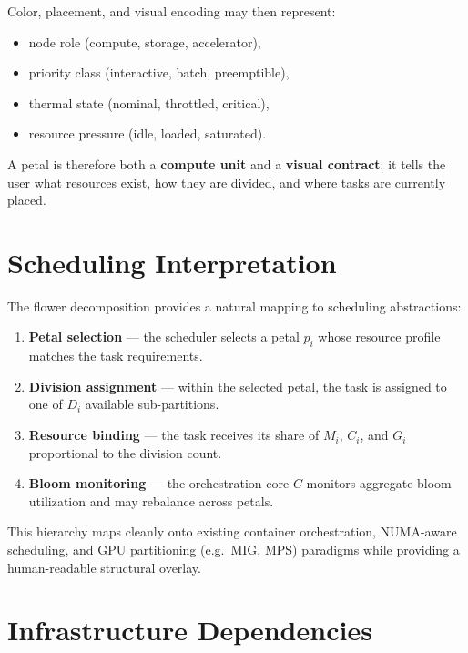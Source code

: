 \documentclass[11pt, a4paper, oneside]{article}
\theoremstyle{definition}
\begin{document}
Color, placement, and visual encoding may then represent:
\begin{itemize}
  \item node role (compute, storage, accelerator),
  \item priority class (interactive, batch, preemptible),
  \item thermal state (nominal, throttled, critical),
  \item resource pressure (idle, loaded, saturated).
\end{itemize}

A petal is therefore both a \textbf{compute unit} and a \textbf{visual
contract}: it tells the user what resources exist, how they are divided, and
where tasks are currently placed.

\section{Scheduling Interpretation}

The flower decomposition provides a natural mapping to scheduling abstractions:

\begin{enumerate}
  \item \textbf{Petal selection} — the scheduler selects a petal $p_i$ whose
        resource profile matches the task requirements.
  \item \textbf{Division assignment} — within the selected petal, the task
        is assigned to one of $D_i$ available sub-partitions.
  \item \textbf{Resource binding} — the task receives its share of $M_i$,
        $C_i$, and $G_i$ proportional to the division count.
  \item \textbf{Bloom monitoring} — the orchestration core $C$ monitors
        aggregate bloom utilization and may rebalance across petals.
\end{enumerate}

This hierarchy maps cleanly onto existing container orchestration, NUMA-aware
scheduling, and GPU partitioning (e.g.\ MIG, MPS) paradigms while providing a
human-readable structural overlay.

\section{Infrastructure Dependencies}
\end{document}
